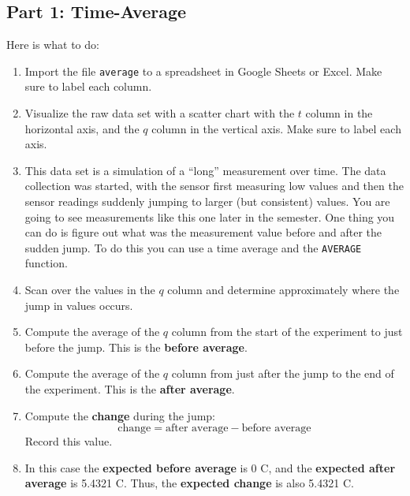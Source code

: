 \subsection{Part 1: Time-Average}
%
Here is what to do:
\begin{enumerate}
    \item Import the file \texttt{average} to a spreadsheet in Google Sheets or Excel. Make sure to label each column.
    \item Visualize the raw data set with a scatter chart with the $t$ column in the horizontal axis, and the $q$ column in the vertical axis. Make sure to label each axis.
    \item This data set is a simulation of a ``long'' measurement over time. The data collection was started, with the sensor first measuring low values and then the sensor readings suddenly jumping to larger (but consistent) values. You are going to see measurements like this one later in the semester. One thing you can do is figure out what was the measurement value before and after the sudden jump. To do this you can use a time average and the \texttt{AVERAGE} function.
    \item Scan over the values in the $q$ column and determine approximately where the jump in values occurs.
    \item Compute the average of the $q$ column from the start of the experiment to just before the jump. This is the \textbf{before average}.
    \item Compute the average of the $q$ column from just after the jump to the end of the experiment. This is the \textbf{after average}.
    \item Compute the \textbf{change} during the jump:
    \begin{equation}
        \text{change} = \text{after average} - \text{before average}
    \end{equation}
    Record this value.
    \item In this case the \textbf{expected before average} is 0 C, and the \textbf{expected after average} is 5.4321 C. Thus, the \textbf{expected change} is also 5.4321 C.
\end{enumerate}
%
